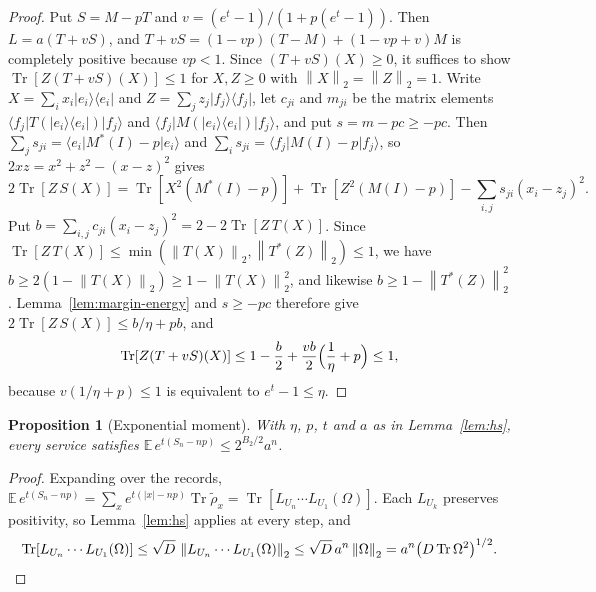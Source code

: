 \documentclass[11pt]{article}
\newtheorem{proposition}[lemma]{Proposition}
\theoremstyle{definition}
\theoremstyle{remark}
\DeclareMathOperator{\Tr}{Tr}
\newcommand{\E}{\mathbb E}
\newcommand{\norm}[1]{\left\lVert#1\right\rVert}
\newcommand{\ket}[1]{\lvert#1\rangle}
\newcommand{\bra}[1]{\langle#1\rvert}
\begin{document}
\begin{proof}
Put $S=M-pT$ and $v=(e^t-1)/(1+p(e^t-1))$. Then $L=a(T+vS)$, and $T+vS=(1-vp)(T-M)+(1-vp+v)M$ is completely positive because $vp<1$. Since $(T+vS)(X)\ge0$, it suffices to show $\Tr[Z(T+vS)(X)]\le1$ for $X,Z\ge0$ with $\norm X_2=\norm Z_2=1$. Write $X=\sum_ix_i\ket{e_i}\bra{e_i}$ and $Z=\sum_jz_j\ket{f_j}\bra{f_j}$, let $c_{ji}$ and $m_{ji}$ be the matrix elements $\bra{f_j}T(\ket{e_i}\bra{e_i})\ket{f_j}$ and $\bra{f_j}M(\ket{e_i}\bra{e_i})\ket{f_j}$, and put $s=m-pc\ge-pc$. Then $\sum_js_{ji}=\bra{e_i}M^*(I)-p\ket{e_i}$ and $\sum_is_{ji}=\bra{f_j}M(I)-p\ket{f_j}$, so $2xz=x^2+z^2-(x-z)^2$ gives
\[
 2\Tr[Z\,S(X)]=\Tr[X^2(M^*(I)-p)]+\Tr[Z^2(M(I)-p)]-\sum_{i,j}s_{ji}(x_i-z_j)^2.
\]
Put $b=\sum_{i,j}c_{ji}(x_i-z_j)^2=2-2\Tr[Z\,T(X)]$. Since $\Tr[Z\,T(X)]\le\min(\norm{T(X)}_2,\norm{T^*(Z)}_2)\le1$, we have $b\ge2(1-\norm{T(X)}_2)\ge1-\norm{T(X)}_2^2$, and likewise $b\ge1-\norm{T^*(Z)}_2^2$. Lemma~\ref{lem:margin-energy} and $s\ge-pc$ therefore give $2\Tr[Z\,S(X)]\le b/\eta+pb$, and
\[
 \Tr[Z(T+vS)(X)]\le1-\frac b2+\frac{vb}2\Bigl(\frac1\eta+p\Bigr)\le1,
\]
because $v(1/\eta+p)\le1$ is equivalent to $e^t-1\le\eta$.
\end{proof}

\begin{proposition}[Exponential moment]\label{prop:moment}
With $\eta$, $p$, $t$ and $a$ as in Lemma~\ref{lem:hs}, every service satisfies $\E\,e^{t(S_n-np)}\le2^{B_2/2}a^n$.
\end{proposition}

\begin{proof}
Expanding over the records, $\E\,e^{t(S_n-np)}=\sum_xe^{t(|x|-np)}\Tr\tilde\rho_x=\Tr[L_{U_n}\cdots L_{U_1}(\Omega)]$. Each $L_{U_k}$ preserves positivity, so Lemma~\ref{lem:hs} applies at every step, and
\[
 \Tr[L_{U_n}\cdots L_{U_1}(\Omega)]\le\sqrt D\,\norm{L_{U_n}\cdots L_{U_1}(\Omega)}_2\le\sqrt D\,a^n\norm\Omega_2=a^n\bigl(D\Tr\Omega^2\bigr)^{1/2}.\qedhere
\]
\end{proof}
\end{document}
